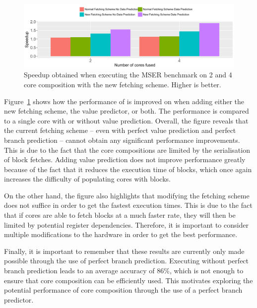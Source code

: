 \begin{figure}[t]
    \centering
    \includegraphics[width=1\textwidth]{chapter3/graphics/mser_final_motiv.pdf}
    \caption{Speedup obtained when executing the MSER benchmark on 2 and 4 core composition with the new fetching scheme. Higher is better.}
    \label{fig:motivation_final}
	\vspace{1em}
\end{figure}

Figure~\ref{fig:motivation_final} shows how the performance of  is improved on when adding either the new fetching scheme, the value predictor, or both.
The performance is compared to a single core with or without value prediction.
Overall, the figure reveals that the current fetching scheme -- even with perfect value prediction and perfect branch prediction -- cannot obtain any significant performance improvements.
This is due to the fact that the core compositions are limited by the serialisation of block fetches.
Adding value prediction does not improve performance greatly because of the fact that it reduces the execution time of blocks, which once again increases the difficulty of populating cores with blocks.

On the other hand, the figure also highlights that modifying the fetching scheme does not suffice in order to get the fastest execution times.
This is due to the fact that if cores are able to fetch blocks at a much faster rate, they will then be limited by potential register dependencies.
Therefore, it is important to consider multiple modifications to the hardware in order to get the best performance.

Finally, it is important to remember that these results are currently only made possible through the use of perfect branch prediction.
Executing  without perfect branch prediction leads to an average accuracy of 86\%, which is not enough to ensure that core composition can be efficiently used.
This motivates exploring the potential performance of core composition through the use of a perfect branch predictor.
